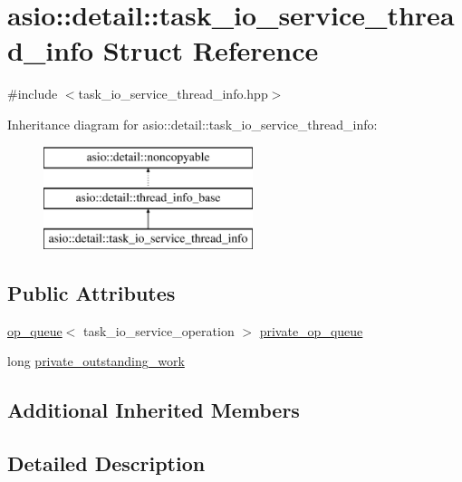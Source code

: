 \hypertarget{structasio_1_1detail_1_1task__io__service__thread__info}{}\section{asio\+:\+:detail\+:\+:task\+\_\+io\+\_\+service\+\_\+thread\+\_\+info Struct Reference}
\label{structasio_1_1detail_1_1task__io__service__thread__info}


{\ttfamily \#include $<$task\+\_\+io\+\_\+service\+\_\+thread\+\_\+info.\+hpp$>$}

Inheritance diagram for asio\+:\+:detail\+:\+:task\+\_\+io\+\_\+service\+\_\+thread\+\_\+info\+:\begin{figure}[H]
\begin{center}
\leavevmode
\includegraphics[height=3.000000cm]{structasio_1_1detail_1_1task__io__service__thread__info}
\end{center}
\end{figure}
\subsection*{Public Attributes}
\begin{DoxyCompactItemize}
\item 
\hyperlink{classasio_1_1detail_1_1op__queue}{op\+\_\+queue}$<$ task\+\_\+io\+\_\+service\+\_\+operation $>$ \hyperlink{structasio_1_1detail_1_1task__io__service__thread__info_a997a840dcb5281af5be3aef23e750799}{private\+\_\+op\+\_\+queue}
\item 
long \hyperlink{structasio_1_1detail_1_1task__io__service__thread__info_a676e6bfbe7c7042cd3f556829e01cfdb}{private\+\_\+outstanding\+\_\+work}
\end{DoxyCompactItemize}
\subsection*{Additional Inherited Members}


\subsection{Detailed Description}


